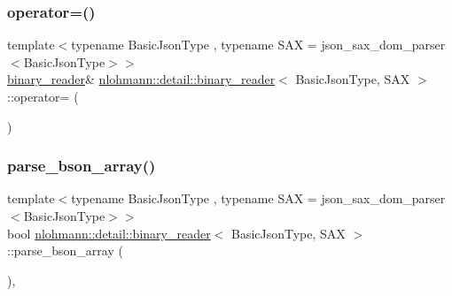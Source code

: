 \mbox{\label{classnlohmann_1_1detail_1_1binary__reader_a7ba0e555da725a2efa17048e67aec9a9}} 
\subsubsection{\texorpdfstring{operator=()}{operator=()}\hspace{0.1cm}{\footnotesize\ttfamily [2/2]}}
{\footnotesize\ttfamily template$<$typename Basic\+Json\+Type , typename S\+AX  = json\+\_\+sax\+\_\+dom\+\_\+parser$<$\+Basic\+Json\+Type$>$$>$ \\
\mbox{\hyperlink{classnlohmann_1_1detail_1_1binary__reader}{binary\+\_\+reader}}\& \mbox{\hyperlink{classnlohmann_1_1detail_1_1binary__reader}{nlohmann\+::detail\+::binary\+\_\+reader}}$<$ Basic\+Json\+Type, S\+AX $>$\+::operator= (\begin{DoxyParamCaption}\item[{\mbox{\hyperlink{classnlohmann_1_1detail_1_1binary__reader}{binary\+\_\+reader}}$<$ Basic\+Json\+Type, S\+AX $>$ \&\&}]{ }\end{DoxyParamCaption})\hspace{0.3cm}{\ttfamily [default]}}

\mbox{\label{classnlohmann_1_1detail_1_1binary__reader_a650dd6f9f05e86eb62cd4717301a5ffa}} 
\subsubsection{\texorpdfstring{parse\_bson\_array()}{parse\_bson\_array()}}
{\footnotesize\ttfamily template$<$typename Basic\+Json\+Type , typename S\+AX  = json\+\_\+sax\+\_\+dom\+\_\+parser$<$\+Basic\+Json\+Type$>$$>$ \\
bool \mbox{\hyperlink{classnlohmann_1_1detail_1_1binary__reader}{nlohmann\+::detail\+::binary\+\_\+reader}}$<$ Basic\+Json\+Type, S\+AX $>$\+::parse\+\_\+bson\+\_\+array (\begin{DoxyParamCaption}{ }\end{DoxyParamCaption})\hspace{0.3cm}{\ttfamily [inline]}, {\ttfamily [private]}}



